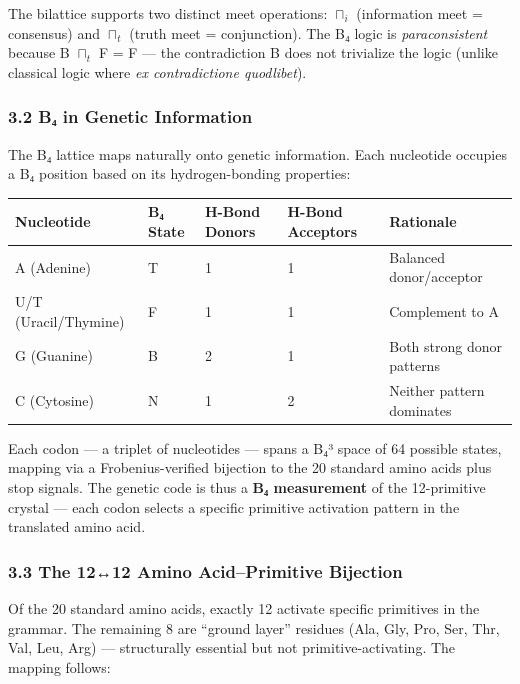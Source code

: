 \documentclass[12pt,a4paper]{article}
\begin{document}
The bilattice supports two distinct meet operations: \(\sqcap_i\)
(information meet = consensus) and \(\sqcap_t\) (truth meet =
conjunction). The B₄ logic is \emph{paraconsistent} because B
\(\sqcap_t\) F = F --- the contradiction B does not trivialize the logic
(unlike classical logic where \emph{ex contradictione quodlibet}).

\hypertarget{bux2084-in-genetic-information}{%
\subsubsection{3.2 B₄ in Genetic
Information}\label{bux2084-in-genetic-information}}

The B₄ lattice maps naturally onto genetic information. Each nucleotide
occupies a B₄ position based on its hydrogen-bonding properties:

\begin{longtable}[]{@{}lllll@{}}
\toprule
Nucleotide & B₄ State & H-Bond Donors & H-Bond Acceptors &
Rationale\tabularnewline
\midrule
\endhead
A (Adenine) & T & 1 & 1 & Balanced donor/acceptor\tabularnewline
U/T (Uracil/Thymine) & F & 1 & 1 & Complement to A\tabularnewline
G (Guanine) & B & 2 & 1 & Both strong donor patterns\tabularnewline
C (Cytosine) & N & 1 & 2 & Neither pattern dominates\tabularnewline
\bottomrule
\end{longtable}

Each codon --- a triplet of nucleotides --- spans a B₄³ space of 64
possible states, mapping via a Frobenius-verified bijection to the 20
standard amino acids plus stop signals. The genetic code is thus a
\textbf{B₄ measurement} of the 12-primitive crystal --- each codon
selects a specific primitive activation pattern in the translated amino
acid.

\hypertarget{the-1212-amino-acidprimitive-bijection}{%
\subsubsection{3.3 The 12↔12 Amino Acid--Primitive
Bijection}\label{the-1212-amino-acidprimitive-bijection}}

Of the 20 standard amino acids, exactly 12 activate specific primitives
in the grammar. The remaining 8 are ``ground layer'' residues (Ala, Gly,
Pro, Ser, Thr, Val, Leu, Arg) --- structurally essential but not
primitive-activating. The mapping follows:
\end{document}
